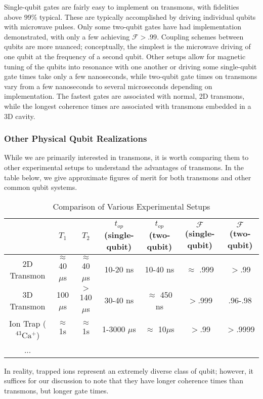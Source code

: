 \documentclass{article}
\begin{document}
\begin{paragraph}{}
Single-qubit gates are fairly easy to implement on transmons, with fidelities above 99\% typical. \cite{transmons} These are typically accomplished by driving individual qubits with microwave pulses. \cite{transmons} Only some two-qubit gates have had implementation demonstrated, with only a few achieving $\mathcal{F}>.99$. \cite{transmons} Coupling schemes between qubits are more nuanced; conceptually, the simplest is the microwave driving of one qubit at the frequency of a second qubit. Other setups allow for magnetic tuning of the qubits into resonance with one another or driving some single-qubit gate times take only a few nanoseconds, while two-qubit gate times on transmons vary from a few nanoseconds to several microseconds depending on implementation. \cite{transmons} \cite{wendin}  The fastest gates are associated with normal, 2D transmons, while the longest coherence times are associated with transmons embedded in a 3D cavity. \cite{wendin}
\end{paragraph}
\subsubsection{Other Physical Qubit Realizations}
\begin{paragraph}{}
While we are primarily interested in transmons, it is worth comparing them to other experimental setups to understand the advantages of transmons.  In the table below, we give approximate figures of merit for both transmons and other common qubit systems. \cite{wendin, bruzewicz, lucas}
\begin{table}[h!]
\centering
\caption{Comparison of Various Experimental Setups}\vspace{6mm} 
\begin{tabular}{c|c|c|c|c|c|c}\label{compare}
&$T_1$ & $T_2$ & $t_{op}$ (single-qubit) & $t_{op}$ (two-qubit) & $\mathcal{F}$ (single-qubit) & $\mathcal{F}$ (two-qubit)\\
\hline
2D Transmon&$\approx$ 40 $\mu$s &$\approx$ 40 $\mu$s&10-20 ns&10-40 ns&$\approx$ .999&$>$.99\\
3D Transmon&100 $\mu$s &$>$140 $\mu$s&30-40 ns&$\approx$ 450 ns&$>$.999&.96-.98\\
Ion Trap ($\mathrm{^{43}Ca^+}$)&$\approx$ 1s  &$\approx$1s& 1-3000 $\mu$s&$\approx$ 10$\mu$s   &$>$.99 &$>$.9999 \\
...&&&&&
\end{tabular}
\end{table}
\end{paragraph}
\begin{paragraph}{}
In reality, trapped ions represent an extremely diverse class of qubit; however, it suffices for our discussion to note that they have longer coherence times than transmons, but longer gate times.  
\end{paragraph}
\end{document}
